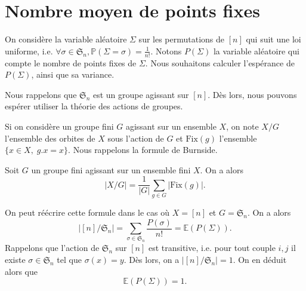 \documentclass[..\main.tex]{subfiles}
\begin{document}
\section{Nombre moyen de points fixes}
On considère la variable aléatoire \(\Sigma\) sur les permutations de \([n]\) qui suit une loi uniforme, i.e. \(\forall \sigma\in \mathfrak{S}_n,\mathbb{P}(\Sigma = \sigma) = \frac{1}{n!}\).
Notons \(P(\Sigma)\) la variable aléatoire qui compte le nombre de points fixes de \(\Sigma\). 
Nous souhaitons calculer l'espérance de \(P(\Sigma)\), ainsi que sa variance.

Nous rappelons que \(\mathfrak{S}_n\) est un groupe agissant sur \([n]\). Dès lors, nous pouvons espérer utiliser la théorie des actions de groupes.


Si on considère un groupe fini \(G\) agissant sur un ensemble \(X\), on note \(X/G\) l'ensemble des orbites de \(X\) sous l'action de \(G\)
 et \(\mathrm{Fix}(g)\) l'ensemble \(\{x\in X,\; g.x = x\}\).
 Nous rappelons la formule de Burnside.
\begin{theorem}
    Soit \(G\) un groupe fini agissant sur un ensemble fini \(X\). On a alors
    \begin{equation}
        \lvert X/G\rvert = \frac{1}{\lvert G\rvert}\sum_{g\in G}\lvert \mathrm{Fix}(g)\rvert.
    \end{equation}
\end{theorem}
On peut réécrire cette formule dans le cas où \(X = [n]\) et \(G = \mathfrak{S}_n\). On a alors
\begin{equation}
    \lvert [n]/\mathfrak{S}_n\rvert = \sum_{\sigma\in \mathfrak{S}_n} \frac{P(\sigma)}{n!} = \mathbb{E}(P(\Sigma)).
\end{equation}
Rappelons que l'action de \(\mathfrak{S}_n\) sur \([n]\) est transitive, i.e. pour tout couple \(i,j\) il existe \(\sigma\in \mathfrak{S}_n\) tel que \(\sigma(x)=y\). Dès lors, on a \(\lvert [n]/\mathfrak{S}_n\rvert = 1\).
On en déduit alors que 
\begin{equation}
    \mathbb{E}(P(\Sigma)) = 1.
\end{equation}
\end{document}
